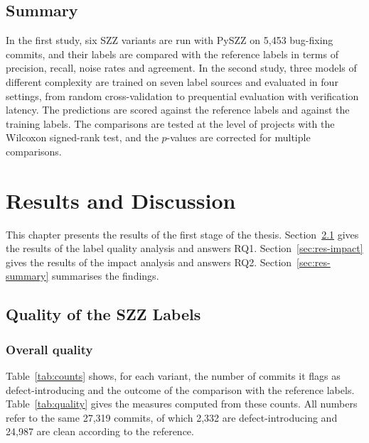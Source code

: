 \documentclass[12pt,a4paper,oneside]{report}
\begin{document}
\section{Summary}

In the first study, six SZZ variants are run with PySZZ on 5,453 bug-fixing
commits, and their labels are compared with the reference labels in terms of
precision, recall, noise rates and agreement. In the second study, three
models of different complexity are trained on seven label sources and
evaluated in four settings, from random cross-validation to prequential
evaluation with verification latency. The predictions are scored against the
reference labels and against the training labels. The comparisons are tested
at the level of projects with the Wilcoxon signed-rank test, and the
$p$-values are corrected for multiple comparisons.

\chapter{Results and Discussion}\label{ch:results}

This chapter presents the results of the first stage of the thesis.
Section~\ref{sec:res-quality} gives the results of the label quality analysis
and answers RQ1. Section~\ref{sec:res-impact} gives the results of the impact
analysis and answers RQ2. Section~\ref{sec:res-summary} summarises the
findings.

\section{Quality of the SZZ Labels}\label{sec:res-quality}

\subsection{Overall quality}

Table~\ref{tab:counts} shows, for each variant, the number of commits it
flags as defect-introducing and the outcome of the comparison with the
reference labels. Table~\ref{tab:quality} gives the measures computed from
these counts. All numbers refer to the same 27,319 commits, of which 2,332
are defect-introducing and 24,987 are clean according to the reference.
\end{document}
